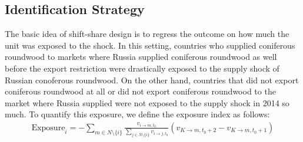 \documentclass[a4paper,12pt]{article}
\begin{document}
\subsection{Identification Strategy}
The basic idea of shift-share design is to regress the outcome on how much the unit was exposed to the shock. In this setting, countries who supplied coniferous roundwood to markets where Russia supplied coniferous roundwood as well before the export restriction were drastically exposed to the supply shock of Russian conoferous roundwood. On the other hand, countries that did not export coniferous roundwood at all or did not export coniferous roundwood to the market where Russia supplied were not exposed to the supply shock in 2014 so much. To quantify this exposure, we define the exposure index as follows:
\begin{align}
    \text{Exposure}_i =  - \sum_{m \in N \setminus \{ i \}} \frac{v_{i \to m, t_0}}{\sum_{j \in N \setminus \{ i \}} v_{i \to j, t_0}} (v_{K \to m, t_0+2} - v_{K \to m, t_0+1})
\end{align}
\end{document}
